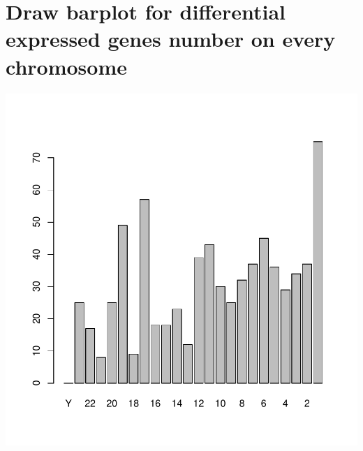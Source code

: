 \documentclass[12pt]{article}
\begin{document}
\section{Draw barplot for differential expressed genes number on every chromosome}
\includegraphics{3rd-009}
\end{document}
